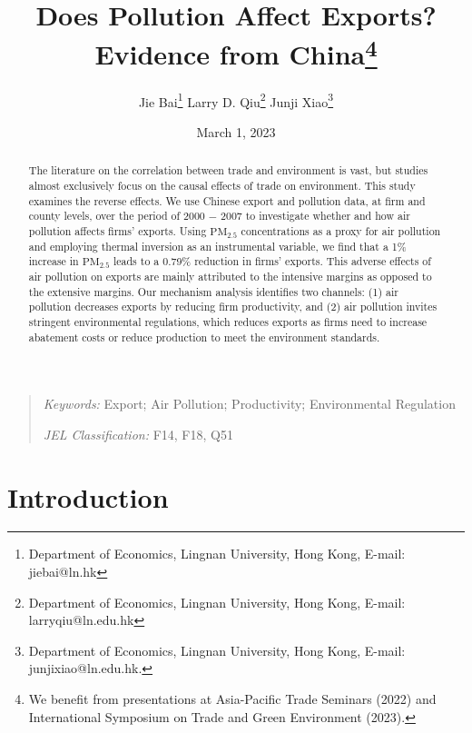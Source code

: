 \documentclass[12pt]{article}
\begin{document}
\title{Does Pollution Affect Exports? Evidence from China\thanks{%
We benefit from presentations at Asia-Pacific Trade Seminars (2022) and International Symposium on
Trade and Green Environment (2023).}}
\author{Jie Bai\thanks{%
Department of Economics, Lingnan University, Hong Kong, E-mail: jiebai@ln.hk}
\quad Larry D. Qiu\thanks{%
Department of Economics, Lingnan University, Hong Kong, E-mail:
larryqiu@ln.edu.hk} \quad Junji Xiao\thanks{%
Department of Economics, Lingnan University, Hong Kong, E-mail:
junjixiao@ln.edu.hk.}}
\date{March 1, 2023}

\maketitle

\begin{abstract}
The literature on the correlation between trade and environment is vast, but
studies almost exclusively focus on the causal effects of trade on
environment. This study examines the reverse effects. We use Chinese export
and pollution data, at firm and county levels, over the period of 2000 $-$ 2007
to investigate whether and how air pollution affects firms' exports. Using $%
\mathrm{PM_{2.5}}$ concentrations as a proxy for air pollution and employing
thermal inversion as an instrumental variable, we find that a 1\% increase
in $\mathrm{PM_{2.5}}$ leads to a 0.79\% reduction in firms' exports. This
adverse effects of air pollution on exports are mainly attributed to the
intensive margins as opposed to the extensive margins. Our mechanism
analysis identifies two channels: (1) air pollution decreases exports by
reducing firm productivity, and (2) air pollution invites stringent
environmental regulations, which reduces exports as firms need to increase
abatement costs or reduce production to meet the environment standards.
\end{abstract}

\begin{quote}
\emph{Keywords:} Export; Air Pollution; Productivity; Environmental 
Regulation 

\emph{JEL Classification:} F14, F18, Q51 
\end{quote}

\newpage  \setcounter{page}{1} 

\section{Introduction}
\end{document}
